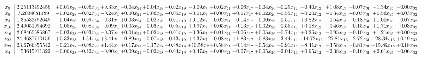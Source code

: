 \documentclass[9pt]{article}
\begin{document}
 \[\begin{array}{c| c c@{\hskip 2pt} c@{\hskip 2pt} c@{\hskip 2pt} c@{\hskip 2pt} c@{\hskip 2pt} c@{\hskip 2pt} c@{\hskip 2pt} c@{\hskip 2pt} c@{\hskip 2pt} c@{\hskip 2pt} c@{\hskip 2pt} c@{\hskip 2pt} c@{\hskip 2pt} c@{\hskip 2pt} c@{\hskip 2pt} c@{\hskip 2pt} }
 x_{9}   &  2.25113492456 & +  0.01 x_{28} & -0.06 x_{34} & +  0.33 x_{1} & -0.04 x_{24} & +  0.04 x_{18} & -0.02 x_{19} & -0.09 x_{7} & +  0.02 x_{21} & +  0.06 x_{17} & -0.04 x_{26} & +  0.29 x_{11} & -0.40 x_{12} & +  1.08 x_{13} & +  0.07 x_{31} & -1.34 x_{15} & -0.00 x_{32}\\
 x_{8}   &  3.2034081189 & -0.02 x_{28} & -0.02 x_{34} & -0.24 x_{1} & +  0.00 x_{24} & -0.06 x_{18} & +  0.05 x_{19} & -0.01 x_{7} & +  0.00 x_{21} & +  0.07 x_{17} & +  0.02 x_{26} & -0.55 x_{11} & -0.20 x_{12} & -0.34 x_{13} & +  0.03 x_{31} & +  0.56 x_{15} & +  0.03 x_{32}\\
 x_{3}   &  1.35532792649 & -0.04 x_{28} & +  0.09 x_{34} & -0.31 x_{1} & +  0.03 x_{24} & -0.02 x_{18} & -0.01 x_{19} & +  0.12 x_{7} & -0.02 x_{21} & -0.14 x_{17} & -0.00 x_{26} & -0.51 x_{11} & +  0.82 x_{12} & -0.54 x_{13} & -0.18 x_{31} & +  1.00 x_{15} & -0.07 x_{32}\\
 x_{10}   &  2.49051094692 & -0.05 x_{28} & +  0.08 x_{34} & -0.09 x_{1} & +  0.05 x_{24} & -0.03 x_{18} & +  0.05 x_{19} & +  0.97 x_{7} & +  0.05 x_{21} & -0.13 x_{17} & +  0.02 x_{26} & -0.55 x_{11} & +  0.18 x_{12} & -0.46 x_{13} & -0.15 x_{31} & +  1.71 x_{15} & -0.03 x_{32}\\
 x_{16}   &  2.68465685867 & -0.03 x_{28} & +  0.03 x_{34} & -0.37 x_{1} & +  0.01 x_{24} & +  0.02 x_{18} & -0.01 x_{19} & -0.36 x_{7} & +  0.01 x_{21} & -0.06 x_{17} & +  0.05 x_{26} & -0.74 x_{11} & +  0.26 x_{12} & -0.95 x_{13} & -0.10 x_{31} & +  1.21 x_{15} & +  0.00 x_{32}\\
 x_{22}   &  24.4687710156 & +  0.33 x_{28} & -1.34 x_{34} & +  3.41 x_{1} & -0.89 x_{24} & -0.07 x_{18} & +  0.13 x_{19} & +  4.37 x_{7} & -0.08 x_{21} & +  1.83 x_{17} & -0.83 x_{26} & +  3.44 x_{11} & -14.72 x_{12} & + 27.81 x_{13} & +  2.72 x_{31} & -28.34 x_{15} & +  0.49 x_{32}\\
 x_{23}   &  23.6766655542 & -0.21 x_{28} & +  0.08 x_{34} & +  1.44 x_{1} & +  0.17 x_{24} & -1.17 x_{18} & +  0.98 x_{19} & + 10.58 x_{7} & +  0.58 x_{21} & -0.14 x_{17} & -0.54 x_{26} & -0.91 x_{11} & -8.41 x_{12} & -3.58 x_{13} & -0.81 x_{31} & + 15.85 x_{15} & +  0.18 x_{32}\\
 x_{4}   &  1.53615911322 & -0.06 x_{28} & +  0.12 x_{34} & -0.90 x_{1} & +  0.09 x_{24} & -0.02 x_{18} & -0.04 x_{19} & +  0.47 x_{7} & -0.00 x_{21} & -0.07 x_{17} & +  0.05 x_{26} & -2.04 x_{11} & +  0.95 x_{12} & -2.38 x_{13} & -0.16 x_{31} & +  2.61 x_{15} & -0.06 x_{32}\\

\end{array}\]
\end{document}
